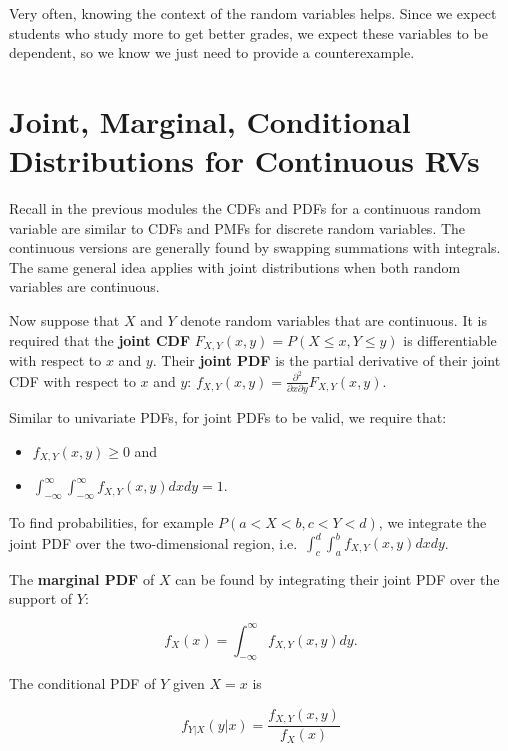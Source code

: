 \documentclass[
]{book}
\providecommand{\tightlist}{%
  \setlength{\itemsep}{0pt}\setlength{\parskip}{0pt}}
\begin{document}
Very often, knowing the context of the random variables helps. Since we expect students who study more to get better grades, we expect these variables to be dependent, so we know we just need to provide a counterexample.

\section{Joint, Marginal, Conditional Distributions for Continuous RVs}\label{joint-marginal-conditional-distributions-for-continuous-rvs}

Recall in the previous modules the CDFs and PDFs for a continuous random variable are similar to CDFs and PMFs for discrete random variables. The continuous versions are generally found by swapping summations with integrals. The same general idea applies with joint distributions when both random variables are continuous.

Now suppose that \(X\) and \(Y\) denote random variables that are continuous. It is required that the \textbf{joint CDF} \(F_{X,Y}(x,y) = P(X \leq x, Y \leq y)\) is differentiable with respect to \(x\) and \(y\). Their \textbf{joint PDF} is the partial derivative of their joint CDF with respect to \(x\) and \(y\): \(f_{X,Y}(x,y) = \frac{\partial^2}{\partial x \partial y} F_{X,Y}(x,y)\).

Similar to univariate PDFs, for joint PDFs to be valid, we require that:

\begin{itemize}
\tightlist
\item
  \(f_{X,Y}(x,y) \geq 0\) and
\item
  \(\int_{-\infty}^\infty \int_{-\infty}^\infty f_{X,Y}(x,y)  dx dy = 1\).
\end{itemize}

To find probabilities, for example \(P(a<X<b, c<Y<d)\), we integrate the joint PDF over the two-dimensional region, i.e.~\(\int_{c}^d \int_{a}^b f_{X,Y}(x,y) dx dy\).

The \textbf{marginal PDF} of \(X\) can be found by integrating their joint PDF over the support of \(Y\):

\begin{equation} 
f_X(x) = \int_{-\infty}^\infty f_{X,Y}(x,y) dy.
\label{eq:5-margPDF}
\end{equation}

The conditional PDF of \(Y\) given \(X=x\) is

\begin{equation} 
f_{Y|X}(y|x) = \frac{f_{X,Y}(x,y)}{f_X(x)}
\label{eq:5-condPDF}
\end{equation}
\end{document}
